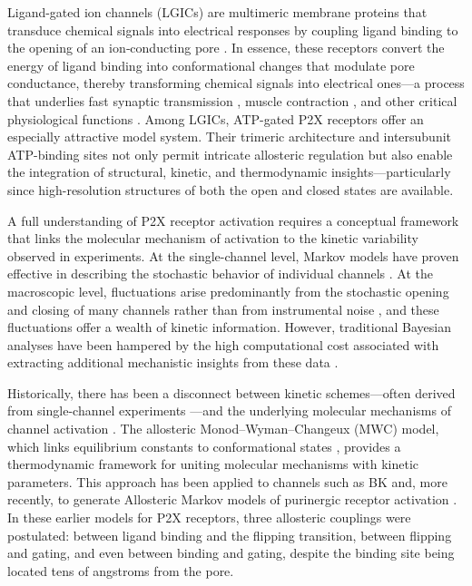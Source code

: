 \documentclass[pdflatex,sn-mathphys-num]{sn-jnl}%
\theoremstyle{thmstyleone}%
\theoremstyle{thmstyletwo}%
\theoremstyle{thmstylethree}%
\begin{document}
Ligand-gated ion channels (LGICs) are multimeric membrane proteins that transduce chemical signals into electrical responses by coupling ligand binding to the opening of an ion‐conducting pore \cite{Changeux1984AcetylcholineRA}. In essence, these receptors convert the energy of ligand binding into conformational changes that modulate pore conductance, thereby transforming chemical signals into electrical ones—a process that underlies fast synaptic transmission \cite{nakanishi1994metabotropic,greengard2001neurobiology}, muscle contraction \cite{peper1982acetylcholine}, and other critical physiological functions \cite{burnstock2007physiology}. Among LGICs, ATP-gated P2X receptors offer an especially attractive model system. Their trimeric architecture \cite{trimer} and intersubunit ATP-binding sites \cite{MarquezKlaka2007IdentificationOA} not only permit intricate allosteric regulation but also enable the integration of structural, kinetic, and thermodynamic insights—particularly since high-resolution structures of both the open \cite{abierta_p2x} and closed \cite{cerrada_p2x} states are available.

A full understanding of P2X receptor activation requires a conceptual framework that links the molecular mechanism of activation to the kinetic variability observed in experiments. At the single-channel level, Markov models have proven effective in describing the stochastic behavior of individual channels \cite{properties_single_channe}. At the macroscopic level, fluctuations arise predominantly from the stochastic opening and closing of many channels rather than from instrumental noise \cite{Moffatt_hume}, and these fluctuations offer a wealth of kinetic information. However, traditional Bayesian analyses have been hampered by the high computational cost associated with extracting additional mechanistic insights from these data \cite{Moffatt}.

Historically, there has been a disconnect between kinetic schemes—often derived from single-channel experiments \cite{properties_single_channe}—and the underlying molecular mechanisms of channel activation \cite{Hattori2012MolecularMO}. The allosteric Monod–Wyman–Changeux (MWC) model, which links equilibrium constants to conformational states \cite{Changeux1984AcetylcholineRA}, provides a thermodynamic framework for uniting molecular mechanisms with kinetic parameters. This approach has been applied to channels such as BK \cite{Horrigan2002CouplingBV} and, more recently, to generate Allosteric Markov models of purinergic receptor activation \cite{Moffatt_hume}. In these earlier models for P2X receptors, three allosteric couplings were postulated: between ligand binding and the flipping transition, between flipping and gating, and even between binding and gating, despite the binding site being located tens of angstroms from the pore.
\end{document}
